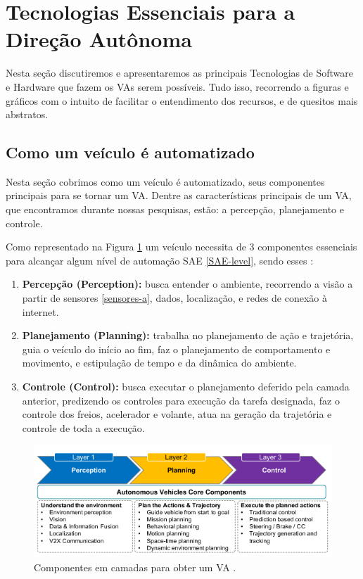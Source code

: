 \section{Tecnologias Essenciais para a Direção Autônoma} \label{essencias_di}

Nesta seção discutiremos e apresentaremos as principais Tecnologias de Software e Hardware que fazem os VAs serem possíveis. Tudo isso, recorrendo a figuras e gráficos com o intuito de facilitar o entendimento dos recursos, e de quesitos mais abstratos. 


\subsection{Como um veículo é automatizado} \label{auto}
Nesta seção cobrimos como um veículo é automatizado, seus componentes principais para se tornar um VA. Dentre as características principais de um VA, que encontramos durante nossas pesquisas, estão: a percepção, planejamento e controle.

Como representado na Figura \ref{figura_perception} um veículo necessita de 3 componentes essenciais para alcançar algum nível de automação SAE \ref{SAE-level}, sendo esses \cite{sensors-yet}:


\begin{enumerate}
 \item \textbf{Percepção (Perception):} busca entender o ambiente, recorrendo a visão a partir de sensores \ref{sensores-a}, dados, localização, e redes de conexão à internet.
\item \textbf{Planejamento (Planning):} trabalha no planejamento de ação e trajetória, guia o veículo do início ao fim, faz o planejamento de comportamento e movimento, e estipulação de tempo e da dinâmica do ambiente.
\item \textbf{Controle (Control):} busca executar o planejamento deferido pela camada anterior, predizendo os controles para execução da tarefa designada, faz o controle dos freios, acelerador e volante, atua na geração da trajetória e controle de toda a execução.

\end{enumerate}

\begin{figure}[H]
\centering
\includegraphics[width=\textwidth]{Figures/perception.png}
\caption{Componentes em camadas para obter um VA \cite{sensors-yet}.}
\label{figura_perception}
\end{figure}

